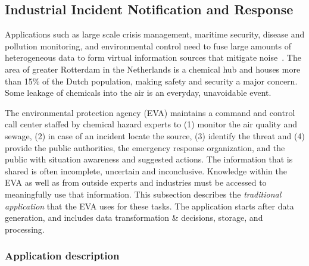 \subsection{Industrial Incident Notification and Response \label{Kees}}

%





Applications such as large scale crisis management, maritime security, disease and pollution
monitoring, and environmental control need to fuse large amounts of heterogeneous data to form virtual
information sources that mitigate noise~\cite{emergency1,emergency2,emergency3,emergency4}.  The area of greater Rotterdam in the Netherlands is a
chemical hub and houses more than 15\% of the Dutch population, making safety and security a major
concern.  Some leakage of chemicals into the air is an everyday, unavoidable event.

The environmental protection agency (EVA) maintains a command and control call center staffed by
chemical hazard experts to (1) monitor the air quality and sewage, (2) in case
of an incident locate the source, (3) identify the threat and (4) provide the public authorities, the
emergency response organization, and the public with situation awareness and suggested
actions.  The information that is shared is often incomplete, uncertain and
inconclusive. Knowledge within the EVA as well as from outside experts and industries must be accessed to meaningfully use that information.  This subsection describes the {\em traditional application} that the EVA uses for these tasks.  The application starts after data generation, and includes data transformation \& decisions, storage, and processing.

\subsubsection*{Application description}


